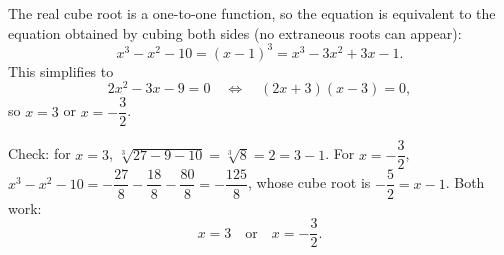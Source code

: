 The real cube root is a one-to-one function, so the equation is equivalent to the equation obtained by cubing both sides (no extraneous roots can appear):
\[
x^3-x^2-10=(x-1)^3=x^3-3x^2+3x-1 .
\]
This simplifies to
\[
2x^2-3x-9=0\quad\Longleftrightarrow\quad(2x+3)(x-3)=0,
\]
so $x=3$ or $x=-\dfrac{3}{2}$.

Check: for $x=3$, $\sqrt[3]{27-9-10}=\sqrt[3]{8}=2=3-1$. For $x=-\dfrac{3}{2}$, $x^3-x^2-10=-\dfrac{27}{8}-\dfrac{18}{8}-\dfrac{80}{8}=-\dfrac{125}{8}$, whose cube root is $-\dfrac{5}{2}=x-1$. Both work:
\[
\boxed{x=3\quad\text{or}\quad x=-\dfrac{3}{2}}.
\]
